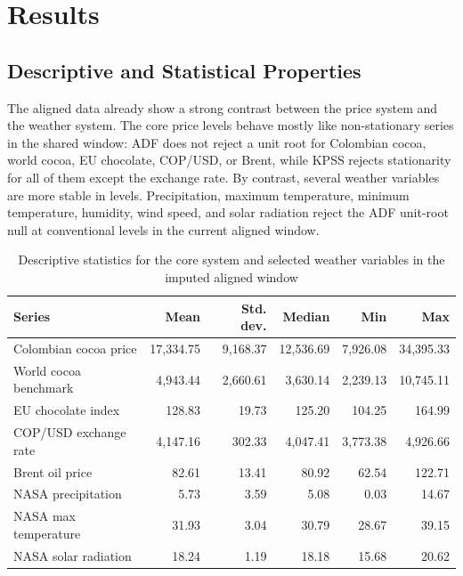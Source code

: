 \documentclass[11pt]{article}
\begin{document}
\section{Results}
\label{sec:results}

\subsection{Descriptive and Statistical Properties}

The aligned data already show a strong contrast between the price system and the weather system. The core price levels behave mostly like non-stationary series in the shared window: ADF does not reject a unit root for Colombian cocoa, world cocoa, EU chocolate, COP/USD, or Brent, while KPSS rejects stationarity for all of them except the exchange rate. By contrast, several weather variables are more stable in levels. Precipitation, maximum temperature, minimum temperature, humidity, wind speed, and solar radiation reject the ADF unit-root null at conventional levels in the current aligned window.

\begin{table}[H]
\centering
\caption{Descriptive statistics for the core system and selected weather variables in the imputed aligned window}
\label{tab:descriptive_stats}
\small
\begin{tabular}{p{4.0cm}rrrrr}
\toprule
Series & Mean & Std. dev. & Median & Min & Max \\
\midrule
Colombian cocoa price & 17{,}334.75 & 9{,}168.37 & 12{,}536.69 & 7{,}926.08 & 34{,}395.33 \\
World cocoa benchmark & 4{,}943.44 & 2{,}660.61 & 3{,}630.14 & 2{,}239.13 & 10{,}745.11 \\
EU chocolate index & 128.83 & 19.73 & 125.20 & 104.25 & 164.99 \\
COP/USD exchange rate & 4{,}147.16 & 302.33 & 4{,}047.41 & 3{,}773.38 & 4{,}926.66 \\
Brent oil price & 82.61 & 13.41 & 80.92 & 62.54 & 122.71 \\
NASA precipitation & 5.73 & 3.59 & 5.08 & 0.03 & 14.67 \\
NASA max temperature & 31.93 & 3.04 & 30.79 & 28.67 & 39.15 \\
NASA solar radiation & 18.24 & 1.19 & 18.18 & 15.68 & 20.62 \\
\bottomrule
\end{tabular}
\normalsize
\end{table}
\end{document}
